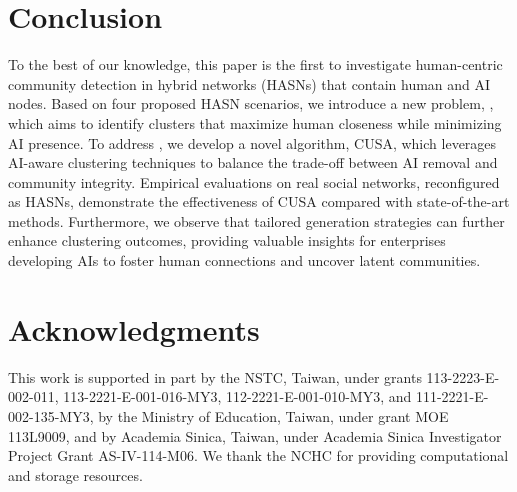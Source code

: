 \section{Conclusion}
\label{sec:conclusion}
To the best of our knowledge, this paper is the first to investigate human-centric community detection in hybrid networks (HASNs) that contain human and AI nodes. Based on four proposed HASN scenarios, we introduce a new problem, \problem, which aims to identify clusters that maximize human closeness while minimizing AI presence. To address \problem, we develop a novel algorithm, CUSA, which leverages AI-aware clustering techniques to balance the trade-off between AI removal and community integrity. Empirical evaluations on real social networks, reconfigured as HASNs, demonstrate the effectiveness of CUSA compared with state-of-the-art methods. Furthermore, we observe that tailored generation strategies can further enhance clustering outcomes, providing valuable insights for enterprises developing AIs to foster human connections and uncover latent communities.

\section*{Acknowledgments}
This work is supported in part by the NSTC, Taiwan, under grants 113-2223-E-002-011, 113-2221-E-001-016-MY3, 112-2221-E-001-010-MY3, and 111-2221-E-002-135-MY3, by the Ministry of Education, Taiwan, under grant MOE 113L9009, and by Academia Sinica, Taiwan, under Academia Sinica Investigator Project Grant AS-IV-114-M06. We thank the NCHC for providing computational and storage resources.


